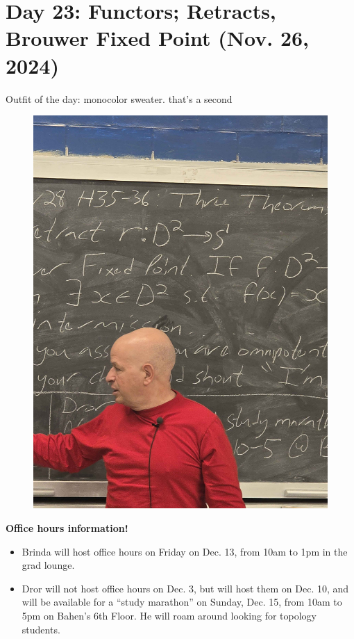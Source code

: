 \section{Day 23: Functors; Retracts, Brouwer Fixed Point (Nov. 26, 2024)}
Outfit of the day: monocolor sweater. that's a second
\begin{figure}[h]
    \centering
    \includegraphics[scale=0.1]{MAT327 Notes/Dror Shirts/dror day 24 shirt.jpg}
\end{figure}

\noindent \textbf{Office hours information!}
\begin{itemize}
    \item Brinda will host office hours on Friday on Dec. 13, from 10am to 1pm in the grad lounge.
    \item Dror will not host office hours on Dec. 3, but will host them on Dec. 10, and will be available for a ``study marathon'' on Sunday, Dec. 15, from 10am to 5pm on Bahen's 6th Floor. He will roam around looking for topology students.
\end{itemize}

